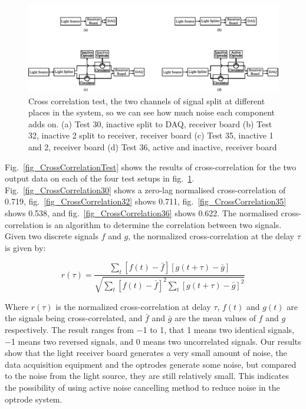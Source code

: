 \begin{figure}[h]
\centering
\includegraphics[width=0.9\linewidth]{4-ANC_Sys/CrossCoTest.pdf}
\caption{Cross correlation test, the two channels of signal split at different places in the system, so we can see how much noise each component adds on. (a) Test 30, inactive split to DAQ, receiver board (b) Test 32, inactive 2 split to receiver, receiver board (c) Test 35, inactive 1 and 2, receiver board (d) Test 36, active and inactive, receiver board}
\label{fig_CrossCoTest}
\end{figure}

Fig.~\ref{fig_CrossCorrelationTest} shows the results of cross-correlation for the two output data on each of the four test setups in fig.~\ref{fig_CrossCoTest}.  Fig.~\ref{fig_CrossCorrelation30} shows a zero-lag normalised cross-correlation of \qty{0.719}{}, fig.~\ref{fig_CrossCorrelation32} shows \qty{0.711}{}, fig.~\ref{fig_CrossCorrelation35} shows \qty{0.538}{}, and fig.~\ref{fig_CrossCorrelation36} shows \qty{0.622}{}.  The normalised cross-correlation is an algorithm to determine the correlation between two signals.  Given two discrete signals $f$ and $g$, the normalized cross-correlation at the delay $\tau$ is given by:

$$r(\tau) = \frac{\sum_{t} \left[ f(t) - \bar{f} \right] \left[ g(t + \tau) - \bar{g} \right]}{\sqrt{\sum_{t} \left[ f(t) - \bar{f} \right]^2 \sum_{t} \left[ g(t + \tau) - \bar{g} \right]^2}}
$$

Where $r(\tau)$ is the normalized cross-correlation at delay $\tau$, $f(t)$ and $g(t)$ are the signals being cross-correlated, and $\bar{f}$ and $\bar{g}$  are the mean values of $f$ and $g$ respectively.  The result ranges from \qty{-1}{} to \qty{1}{}, that \qty{1}{} means two identical signals, \qty{-1}{} means two reversed signals, and \qty{0}{} means two uncorrelated signals.  Our results show that the light receiver board generates a very small amount of noise, the data acquisition equipment and the optrodes generate some noise, but compared to the noise from the light source, they are still relatively small.  This indicates the possibility of using active noise cancelling method to reduce noise in the optrode system.

